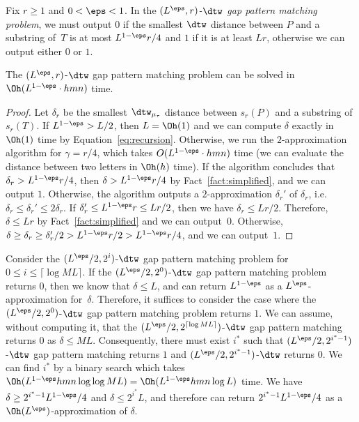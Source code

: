 Fix $r \ge 1$ and $0 < \eps < 1$. In the \emph{$(L^\eps, r)$-$\dtw$ gap pattern matching problem}, we must output $0$ if the smallest $\dtw$ distance between $P$ and a substring of~$T$ is at most $L^{1 - \eps} r/4$ and $1$ if it is at least $L r$, otherwise we can output either $0$ or $1$. 

\begin{claim}\label{lm:tree_metric}
The $(L^{\eps}, r)$-$\dtw$ gap pattern matching problem can be solved in $\Oh(L^{1-\eps} \cdot hmn)$ time. 
\end{claim}
\begin{proof}
Let $\delta_r$ be the smallest $\dtw_{\mu_\tau}$ distance between $s_r(P)$ and a substring of $s_r(T)$. 
If $L^{1-\eps} > L/2$, then $L = \Oh(1)$ and we can compute $\delta$ exactly in $\Oh(1)$ time by Equation~\ref{eq:recursion}. Otherwise, we run the $2$-approximation algorithm for $\gamma = r/4$, which takes $O(L^{1 - \eps} \cdot hmn)$ time (we can evaluate the distance between two letters in $\Oh(h)$ time). If the algorithm concludes that $\delta_r > L^{1 - \eps} r /4$, then $\delta >  L^{1 - \eps} r /4$ by Fact~\ref{fact:simplified}, and we can output $1$. Otherwise, the algorithm outputs a $2$-approximation $\delta_r'$ of $\delta_r$, i.e. $\delta_r \le \delta_r' \le 2\delta_r$. If $\delta_r' \le L^{1 - \eps} r \le Lr / 2$, then we have $\delta_r \le Lr / 2$. Therefore, $\delta \le Lr$ by Fact~\ref{fact:simplified} and we can output~$0$. Otherwise, $\delta \ge \delta_r \ge \delta_r'/2 > L^{1 - \eps} r/2 > L^{1 - \eps} r/4$, and we can output~$1$.  
\end{proof}

Consider the $(L^{\eps} / 2, 2^i)$-$\dtw$ gap pattern matching problem for $0 \le i \le \lceil \log ML \rceil$. If the $(L^{\eps} / 2, 2^0)$-$\dtw$
gap pattern matching problem returns $0$, then we know that $\delta \le L$,
and can return $L^{1 - \eps}$ as a $L^{\eps}$-approximation for~$\delta$. Therefore, it suffices to consider the case where the $(L^{\eps} / 2, 2^0)$-$\dtw$ gap pattern matching problem returns $1$. We can assume, without computing it, that the $(L^{\eps}/2, 2^{ \lceil
  \log ML \rceil})$-$\dtw$ gap pattern matching returns $0$ as $\delta \le M L$. Consequently, there must exist $i^\ast$ such that $(L^{\eps} /
2, 2^{i^\ast - 1})$-$\dtw$ gap pattern matching returns $1$ and $(L^{\eps} / 2, 2^{i^\ast - 1})$-$\dtw$ returns $0$. We can find $i^\ast$ by a binary
search which takes $\Oh(L^{1 - \eps} hmn \log \log M L) = \Oh(L^{1 - \eps} hmn \log L)$ time. We have $\delta \ge  2^{i^\ast-1} L^{1 - \eps} / 4$ and $\delta \le 2^{i^\ast} L$, and therefore can return $2^{i^\ast-1} L^{1 - \eps} / 4$ as a
$\Oh(L^{\eps})$-approximation of $\delta$.